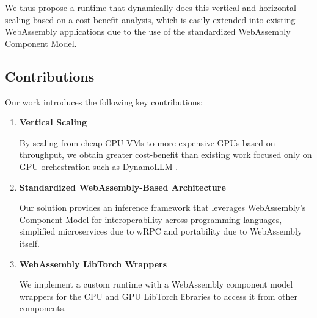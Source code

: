 


We thus propose a runtime that dynamically does this vertical and horizontal scaling based on a cost-benefit analysis, which is easily extended into existing WebAssembly applications due to the use of the standardized WebAssembly Component Model. 

\subsection{Contributions}

Our work introduces the following key contributions:

\begin{enumerate}
    \item \textbf{Vertical Scaling}
    
    By scaling from cheap CPU VMs to more expensive GPUs based on throughput, we obtain greater cost-benefit than existing work focused only on GPU orchestration such as DynamoLLM \cite{dynamollm}.
    
    \item \textbf{Standardized WebAssembly-Based Architecture} 
    
    Our solution provides an inference framework that leverages WebAssembly’s Component Model for interoperability across programming languages, simplified microservices due to wRPC and portability due to WebAssembly itself. 

    \item \textbf{WebAssembly LibTorch Wrappers}
    
    We implement a custom runtime with a WebAssembly component model wrappers for the CPU and GPU LibTorch libraries to access it from other components.

\end{enumerate}

